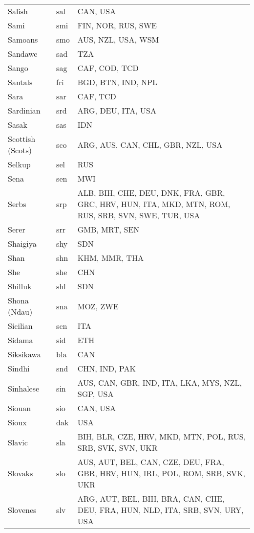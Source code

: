 \documentclass[12pt]{article}
\begin{document}
\begin{center}
\begin{longtable}{|p{7cm}|p{1cm}|p{7cm}|}
Salish	&	sal 	&	CAN, USA	\\	\cline{1-3}
Sami	&	smi 	&	FIN, NOR, RUS, SWE	\\	\cline{1-3}
Samoans	&	smo 	&	AUS, NZL, USA, WSM	\\	\cline{1-3}
Sandawe	&	sad 	&	TZA	\\	\cline{1-3}
Sango	&	sag 	&	CAF, COD, TCD	\\	\cline{1-3}
Santals	&	fri	&	BGD, BTN, IND, NPL	\\	\cline{1-3}
Sara	&	sar	&	CAF, TCD	\\	\cline{1-3}
Sardinian	&	srd 	&	ARG, DEU, ITA, USA	\\	\cline{1-3}
Sasak	&	sas 	&	IDN	\\	\cline{1-3}
Scottish (Scots)	&	sco 	&	ARG, AUS, CAN, CHL, GBR, NZL, USA	\\	\cline{1-3}
Selkup	&	sel 	&	RUS	\\	\cline{1-3}
Sena	&	sen	&	MWI	\\	\cline{1-3}
Serbs	&	srp 	&	ALB, BIH, CHE, DEU, DNK, FRA, GBR, GRC, HRV, HUN, ITA, MKD, MTN, ROM, RUS, SRB, SVN, SWE, TUR, USA	\\	\cline{1-3}
Serer	&	srr	&	GMB, MRT, SEN	\\	\cline{1-3}
Shaigiya	&	shy	&	SDN	\\	\cline{1-3}
Shan	&	shn 	&	KHM, MMR, THA	\\	\cline{1-3}
She	&	she	&	CHN	\\	\cline{1-3}
Shilluk	&	shl	&	SDN	\\	\cline{1-3}
Shona (Ndau)	&	sna 	&	MOZ, ZWE	\\	\cline{1-3}
Sicilian	&	scn 	&	ITA	\\	\cline{1-3}
Sidama	&	sid 	&	ETH	\\	\cline{1-3}
Siksikawa	&	bla 	&	CAN	\\	\cline{1-3}
Sindhi	&	snd 	&	CHN, IND, PAK	\\	\cline{1-3}
Sinhalese	&	sin 	&	AUS, CAN, GBR, IND, ITA, LKA, MYS, NZL, SGP, USA	\\	\cline{1-3}
Siouan	&	sio 	&	CAN, USA	\\	\cline{1-3}
Sioux	&	dak 	&	USA	\\	\cline{1-3}
Slavic	&	sla 	&	BIH, BLR, CZE, HRV, MKD, MTN, POL, RUS, SRB, SVK, SVN, UKR	\\	\cline{1-3}
Slovaks	&	slo	&	AUS, AUT, BEL, CAN, CZE, DEU, FRA, GBR, HRV, HUN, IRL, POL, ROM, SRB, SVK, UKR	\\	\cline{1-3}
Slovenes	&	slv 	&	ARG, AUT, BEL, BIH, BRA, CAN, CHE, DEU, FRA, HUN, NLD, ITA, SRB, SVN, URY, USA	\\	 \cline{1-3}

\end{longtable}
\end{center}
\end{document}

